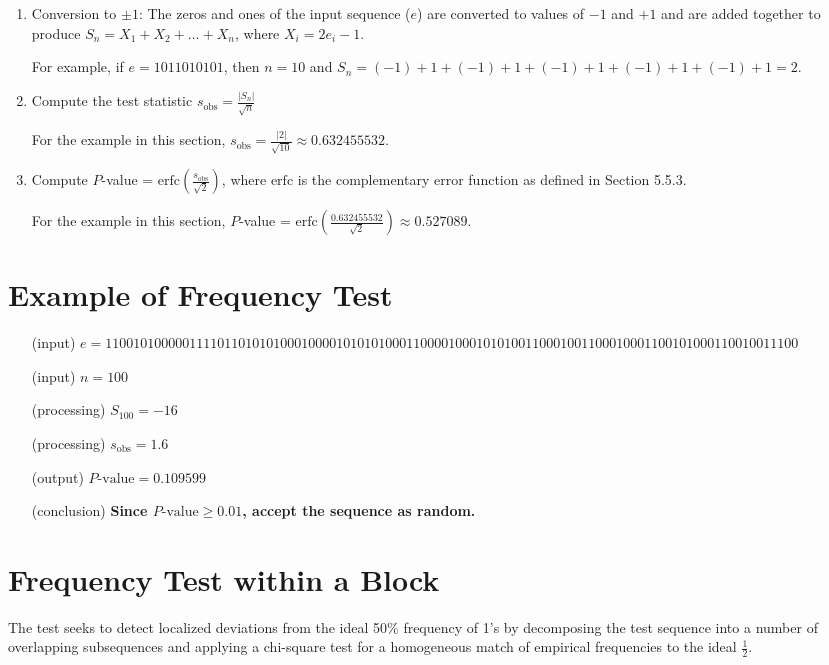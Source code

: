 \documentclass[12pt,openany]{book}
\theoremstyle{definition}
\begin{document}
	\begin{enumerate}
		\item Conversion to \(\pm 1\): The zeros and ones of the input sequence (\(e\)) are converted to values of \(-1\) and \(+1\) and are added together to produce \(S_n = X_1 + X_2 + \ldots + X_n\), where \(X_i = 2e_i - 1\).
		
		For example, if \(e = 1011010101\), then \(n=10\) and \(S_n = (-1) + 1 + (-1) + 1 + (-1) + 1 + (-1) + 1 + (-1) + 1 = 2\).
		
		\item Compute the test statistic \(s_{\text{obs}} = \frac{|S_n|}{\sqrt{n}}\)
		
		For the example in this section, \(s_{\text{obs}} = \frac{|2|}{\sqrt{10}} \approx 0.632455532\).
		
		\item Compute \(P\)-value = \(\text{erfc}\left(\frac{s_{\text{obs}}}{\sqrt{2}}\right)\), where \(\text{erfc}\) is the complementary error function as defined in Section 5.5.3.
		
		For the example in this section, \(P\)-value = \(\text{erfc}\left(\frac{0.632455532}{\sqrt{2}}\right) \approx 0.527089\).
	\end{enumerate}

	\section*{Example of Frequency Test}
	
	\begin{itemize}
		\item[(input)] \( e = 110010100000111101101010100010000101010100011000010001010100110001001100010001100101000110010011100 \)
		\item[(input)] \( n = 100 \)
		\item[(processing)] \( S_{100} = -16 \)
		\item[(processing)] \( s_{\text{obs}} = 1.6 \)
		\item[(output)] \( P\text{-value} = 0.109599 \)
		\item[(conclusion)] \textbf{Since \( P\text{-value} \geq 0.01 \), accept the sequence as random.}
	\end{itemize}

	\section*{Frequency Test within a Block}
	
	The test seeks to detect localized deviations from the ideal 50\% frequency of 1's by decomposing the test sequence into a number of overlapping subsequences and applying a chi-square test for a homogeneous match of empirical frequencies to the ideal \( \frac{1}{2} \).
	
\end{document}
